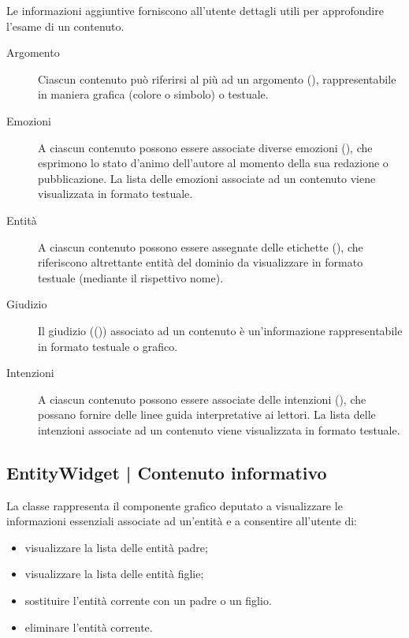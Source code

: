 \documentclass[10pt,a4paper,headinclude,footinclude,hidelinks]{scrreprt} %
\begin{document}
	Le informazioni aggiuntive forniscono all'utente dettagli utili per approfondire l'esame di un contenuto.
	\begin{description}
	\item[Argomento] Ciascun contenuto può riferirsi al più ad un argomento (\textit{}), rappresentabile in maniera grafica (colore o simbolo) o testuale.
	\item[Emozioni] A ciascun contenuto possono essere associate diverse emozioni (\textit{}), che esprimono lo stato d'animo dell'autore al momento della sua redazione o pubblicazione. La lista delle emozioni associate ad un contenuto viene visualizzata in formato testuale.
	\item[Entit\`a] A ciascun contenuto possono essere assegnate delle etichette (\textit{}), che riferiscono altrettante entità del dominio da visualizzare in formato testuale (mediante il rispettivo nome).
	\item[Giudizio] Il giudizio ((\textit{})) associato ad un contenuto è un'informazione rappresentabile in formato testuale o grafico.
	\item[Intenzioni] A ciascun contenuto possono essere associate delle intenzioni (\textit{}), che possano fornire delle linee guida interpretative ai lettori. La lista delle intenzioni associate ad un contenuto viene visualizzata in formato testuale.
	\end{description}

	\subsection[EntityWidget]{EntityWidget | Contenuto informativo}
	\label{sec:stage:design:view:entity-widget}
	La classe \textit{} rappresenta il componente grafico deputato a visualizzare le informazioni essenziali associate ad un'entità e a consentire all'utente di:
	\begin{itemize}
	\item visualizzare la lista delle entità padre;
	\item visualizzare la lista delle entità figlie;
	\item sostituire l'entità corrente con un padre o un figlio.
	\item eliminare l'entità corrente.
	\end{itemize}
\end{document}
